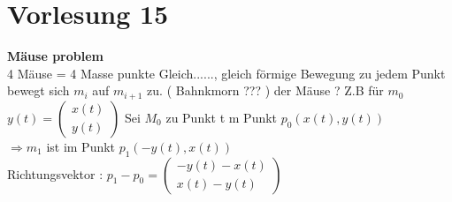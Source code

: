 \section{Vorlesung 15}
\textbf{Mäuse problem }\\
4 Mäuse = 4 Masse punkte 
Gleich......, gleich förmige Bewegung zu jedem Punkt bewegt sich $m_i$ auf $m_{i+1}$ zu.
( Bahnkmorn ??? ) der Mäuse ? Z.B für $m_0$\\
$y(t)= \begin{pmatrix}
x(t)\\
y(t)
\end{pmatrix}$
Sei $M_0$ zu Punkt t m Punkt $p_0(x(t),y(t))$\\
 $\Rightarrow m_1$ ist im Punkt $p_1 (-y(t),x(t))$\\
 Richtungsvektor : $p_1 - p_0 = \begin{pmatrix}
 -y(t) - x(t)\\
 x(t)-y(t)
 \end{pmatrix}$
 
 
